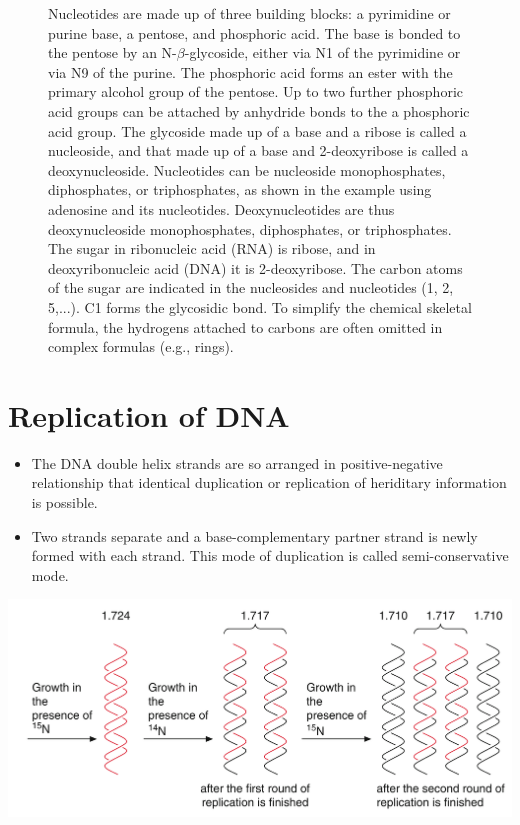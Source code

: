 \documentclass[11pt,ignorenonframetext,aspectratio=169]{beamer}
\providecommand{\tightlist}{%
  \setlength{\itemsep}{0pt}\setlength{\parskip}{0pt}}
\begin{document}
\begin{frame}{}
\begin{figure}
\begin{columns}[T,onlytextwidth]
  \caption{\newline Nucleotides are made up of three building blocks: a pyrimidine or purine base, a pentose, and phosphoric acid. The base is bonded to the pentose by an N-$\beta$-glycoside, either via N1 of the pyrimidine or via N9 of the purine. The phosphoric acid forms an ester with the primary alcohol group of the pentose. Up to two further phosphoric acid groups can be attached by anhydride bonds to the a phosphoric acid group. The glycoside made up of a base and a ribose is called a nucleoside, and that made up of a base and 2-deoxyribose is called a deoxynucleoside. Nucleotides can be nucleoside monophosphates, diphosphates, or triphosphates, as shown in the example using adenosine and its nucleotides. Deoxynucleotides are thus deoxynucleoside monophosphates, diphosphates, or triphosphates. The sugar in ribonucleic acid (RNA) is ribose, and in deoxyribonucleic acid (DNA) it is 2-deoxyribose. The carbon atoms of the sugar are indicated in the nucleosides and nucleotides (1, 2, 5,...). C1 forms the glycosidic bond. To simplify the chemical skeletal formula, the hydrogens attached to carbons are often omitted in complex formulas (e.g., rings).}
  \label{fig:nucleotide-blocks}
  
  \end{columns}
\end{figure}

\end{frame}

\hypertarget{replication-of-dna}{%
\section{Replication of DNA}\label{replication-of-dna}}

\begin{frame}{}
\protect\hypertarget{section-5}{}

\begin{itemize}
\tightlist
\item
  The DNA double helix strands are so arranged in positive-negative
  relationship that identical duplication or replication of heriditary
  information is possible.
\item
  Two strands separate and a base-complementary partner strand is newly
  formed with each strand. This mode of duplication is called
  semi-conservative mode.
\end{itemize}

\begin{center}\includegraphics[width=0.52\linewidth]{../images/semi_conservative_replication} \end{center}

\end{frame}
\end{document}
